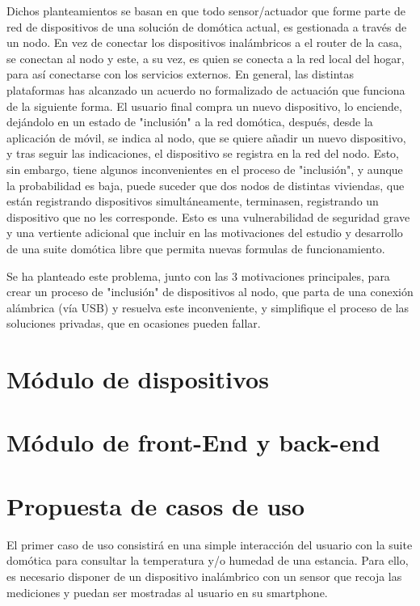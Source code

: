 Dichos planteamientos se basan en que todo sensor/actuador que forme parte de red de dispositivos de una solución de domótica actual, es gestionada a través de un nodo. En vez de conectar los dispositivos inalámbricos a el router de la casa, se conectan al nodo y este, a su vez, es quien se conecta a la red local del hogar, para así conectarse con los servicios externos. En general, las distintas plataformas has alcanzado un acuerdo no formalizado de actuación que funciona de la siguiente forma. El usuario final compra un nuevo dispositivo, lo enciende, dejándolo en un estado de "inclusión" a la red domótica, después, desde la aplicación de móvil, se indica al nodo, que se quiere añadir un nuevo dispositivo, y tras seguir las indicaciones, el dispositivo se registra en la red del nodo. Esto, sin embargo, tiene algunos inconvenientes en el proceso de "inclusión", y aunque la probabilidad es baja, puede suceder que dos nodos de distintas viviendas, que están registrando dispositivos simultáneamente, terminasen, registrando un dispositivo que no les corresponde. Esto es una vulnerabilidad de seguridad grave y una vertiente adicional que incluir en las motivaciones del estudio y desarrollo de una suite domótica libre que permita nuevas formulas de funcionamiento.

Se ha planteado este problema, junto con las 3 motivaciones principales, para crear un proceso de "inclusión" de dispositivos al nodo, que parta de una conexión alámbrica (vía USB) y resuelva este inconveniente, y simplifique el proceso de las soluciones privadas, que en ocasiones pueden fallar.

\vspace{1cm}


\section{Módulo de dispositivos}
\label{ch:Capitulo3.3}



\section{Módulo de front-End y back-end}
\label{ch:Capitulo3.4}

\section{Propuesta de casos de uso}
\label{ch:Capitulo3.5}

El primer caso de uso consistirá en una simple interacción del usuario con la suite domótica para consultar la temperatura y/o humedad de una estancia. Para ello, es necesario disponer de un dispositivo inalámbrico con un sensor que recoja las mediciones y puedan ser mostradas al usuario en su smartphone.

